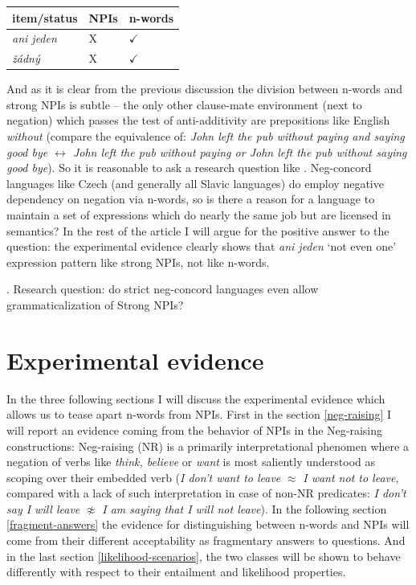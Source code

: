 \documentclass[12pt]{scrartcl}
\begin{document}
\begin{longtable}[]{@{}lll@{}}
\toprule
item/status & NPIs & n-words\tabularnewline
\midrule
\endhead
\emph{ani jeden} & X & \(\checkmark\)\tabularnewline
\emph{žádný} & X & \(\checkmark\)\tabularnewline
\bottomrule
\end{longtable}

And as it is clear from the previous discussion the division between n-words and strong NPIs is subtle -- the only other clause-mate environment (next to negation) which passes the test of anti-additivity are prepositions like English \textit{without} (compare the equivalence of: \textit{John left the pub without paying and saying good bye $\leftrightarrow$ John left the pub without paying or John left the pub without saying good bye}). So it is reasonable to ask a research question like \Next. Neg-concord languages like Czech (and generally all Slavic languages) do employ negative dependency on negation via n-words, so is there a reason for a language to maintain a set of expressions which do nearly the same job but are licensed in semantics? In the rest of the article I will argue for the positive answer to the question: the experimental evidence clearly shows that \textit{ani jeden} `not even one' expression pattern like strong NPIs, not like n-words.

\ex. Research question: do strict neg-concord languages even allow grammaticalization of Strong NPIs?

\hypertarget{experimental-evidence}{%
\section{Experimental evidence}\label{experimental-evidence}}

In the three following sections I will discuss the experimental evidence which allows us to tease apart n-words from NPIs. First in the section \ref{neg-raising} I will report an evidence coming from the behavior of NPIs in the Neg-raising constructions: Neg-raising (NR) is a primarily interpretational phenomen where a negation of verbs like \textit{think, believe} or \textit{want} is most saliently understood as scoping over their embedded verb (\textit{I don't want to leave} $\approx$ \textit{I want not to leave}, compared with a lack of such interpretation in case of non-NR predicates: \textit{I don't say I will leave} $\not\approx$ \textit{I am saying that I will not leave}). In the following section \ref{fragment-answers} the evidence for distinguishing between n-words and NPIs will come from their different acceptability as fragmentary answers to questions. And in the last section \ref{likelihood-scenarios}, the two classes will be shown to behave differently with respect to their entailment and likelihood properties.
\end{document}
